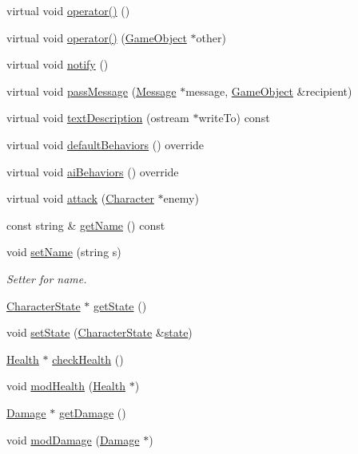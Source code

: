 \begin{DoxyCompactItemize}
\item 
virtual void \hyperlink{class_character_a3c4dfc59865fe39251070cd0b92d34ac}{operator()} ()
\item 
virtual void \hyperlink{class_character_a6dde2dd17bfd31ea6e008d83bdcd3188}{operator()} (\hyperlink{class_game_object}{Game\-Object} $\ast$other)
\item 
virtual void \hyperlink{class_character_a457dab4f04550716888425da681b9f1f}{notify} ()
\item 
virtual void \hyperlink{class_character_ad0574321c7429301d4d9dd1dd33301c4}{pass\-Message} (\hyperlink{struct_message}{Message} $\ast$message, \hyperlink{class_game_object}{Game\-Object} \&recipient)
\item 
virtual void \hyperlink{class_character_a2ab1090f959f0c66b098e0463d4c1bdd}{text\-Description} (ostream $\ast$write\-To) const 
\item 
virtual void \hyperlink{class_character_ac96260f4fd9b68a33919a65bc9da9bca}{default\-Behaviors} () override
\item 
virtual void \hyperlink{class_character_a7bd55d3615c1eb092f800d8634fa9695}{ai\-Behaviors} () override
\item 
virtual void \hyperlink{class_character_a7be3b65a2bc5facbb39ee208f5898560}{attack} (\hyperlink{class_character}{Character} $\ast$enemy)
\item 
const string \& \hyperlink{class_character_afb6ef570e4bfc7f1d81ead9ed7e4c744}{get\-Name} () const 
\item 
void \hyperlink{class_character_a9bf101bdd0a5cf667f058da2c66f989b}{set\-Name} (string s)
\begin{DoxyCompactList}\small\item\em Setter for name. \end{DoxyCompactList}\item 
\hyperlink{_character_data_8h_aacbb008a93d24b04a8779bbdbd8880b5}{Character\-State} $\ast$ \hyperlink{class_character_a1887dada668e71e5b072e71178df87b0}{get\-State} ()
\item 
void \hyperlink{class_character_ae3a8fe67a8b3761322a448468c6a0b09}{set\-State} (\hyperlink{_character_data_8h_aacbb008a93d24b04a8779bbdbd8880b5}{Character\-State} \&\hyperlink{class_character_ac20f1ebda238017ddc245ecdce827037}{state})
\item 
\hyperlink{struct_health}{Health} $\ast$ \hyperlink{class_character_a225fa5b49f3330f70936ece3f6993448}{check\-Health} ()
\item 
void \hyperlink{class_character_a22d3d47dcf5775dac41539ecc3dee072}{mod\-Health} (\hyperlink{struct_health}{Health} $\ast$)
\item 
\hyperlink{struct_damage}{Damage} $\ast$ \hyperlink{class_character_a180960a01e928627bfd672dbb19b2f56}{get\-Damage} ()
\item 
void \hyperlink{class_character_a80e7bdfad72a223ff4a98e45089ea896}{mod\-Damage} (\hyperlink{struct_damage}{Damage} $\ast$)
\end{DoxyCompactItemize}
